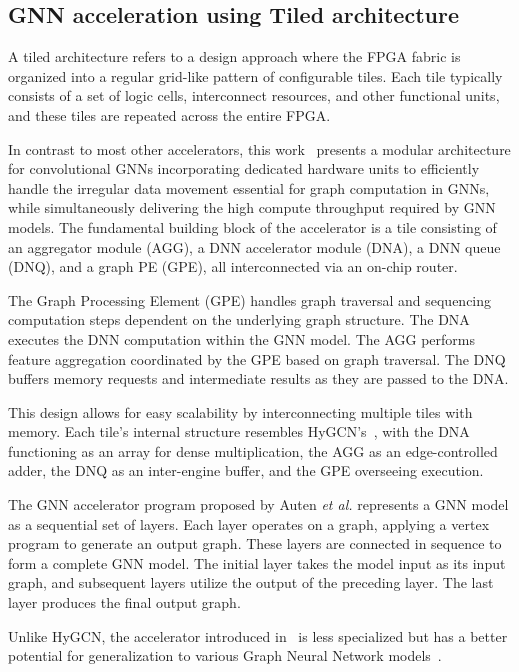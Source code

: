 \subsection{GNN acceleration using Tiled architecture}
\label{subsec:tiled-architectures}%

A tiled architecture refers to a design approach where the FPGA fabric is organized into a regular grid-like pattern of configurable tiles.
Each tile typically consists of a set of logic cells, interconnect resources, and other functional units, and these tiles are repeated across the entire FPGA.

In contrast to most other accelerators, this work~\cite{9218751} presents a modular architecture for convolutional GNNs incorporating dedicated hardware units to efficiently handle the irregular data movement essential for graph computation in GNNs, while simultaneously delivering the high compute throughput required by GNN models.
The fundamental building block of the accelerator is a tile consisting of an aggregator module (AGG), a DNN accelerator module (DNA), a DNN queue (DNQ), and a graph PE (GPE), all interconnected via an on-chip router.

The Graph Processing Element (GPE) handles graph traversal and sequencing computation steps dependent on the underlying graph structure.
The DNA executes the DNN computation within the GNN model.
The AGG performs feature aggregation coordinated by the GPE based on graph traversal.
The DNQ buffers memory requests and intermediate results as they are passed to the DNA.

This design allows for easy scalability by interconnecting multiple tiles with memory.
Each tile's internal structure resembles HyGCN's~\cite{DBLP:journals/corr/abs-2010-00130}, with the DNA functioning as an array for dense multiplication, the AGG as an edge-controlled adder, the DNQ as an inter-engine buffer, and the GPE overseeing execution.

The GNN accelerator program proposed by Auten \textit{et al.} represents a GNN model as a sequential set of layers.
Each layer operates on a graph, applying a vertex program to generate an output graph.
These layers are connected in sequence to form a complete GNN model.
The initial layer takes the model input as its input graph, and subsequent layers utilize the output of the preceding layer.
The last layer produces the final output graph.

Unlike HyGCN, the accelerator introduced in~\cite{9218751} is less specialized but has a better potential for generalization to various Graph Neural Network models~\cite{DBLP:journals/corr/abs-2010-00130}.

